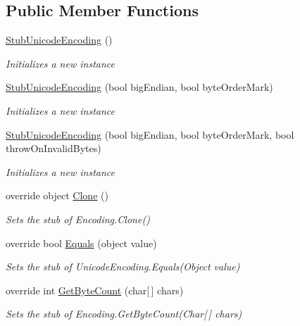 \subsection*{Public Member Functions}
\begin{DoxyCompactItemize}
\item 
\hyperlink{class_system_1_1_text_1_1_fakes_1_1_stub_unicode_encoding_a79ed40791d3b0cd951527b65637039e6}{Stub\-Unicode\-Encoding} ()
\begin{DoxyCompactList}\small\item\em Initializes a new instance\end{DoxyCompactList}\item 
\hyperlink{class_system_1_1_text_1_1_fakes_1_1_stub_unicode_encoding_a7297548b8329e37b5a799c65c074db31}{Stub\-Unicode\-Encoding} (bool big\-Endian, bool byte\-Order\-Mark)
\begin{DoxyCompactList}\small\item\em Initializes a new instance\end{DoxyCompactList}\item 
\hyperlink{class_system_1_1_text_1_1_fakes_1_1_stub_unicode_encoding_a90db09470769143d8acdbf4def6d99cc}{Stub\-Unicode\-Encoding} (bool big\-Endian, bool byte\-Order\-Mark, bool throw\-On\-Invalid\-Bytes)
\begin{DoxyCompactList}\small\item\em Initializes a new instance\end{DoxyCompactList}\item 
override object \hyperlink{class_system_1_1_text_1_1_fakes_1_1_stub_unicode_encoding_a7917244463675a49de7adb5b5403c7b7}{Clone} ()
\begin{DoxyCompactList}\small\item\em Sets the stub of Encoding.\-Clone()\end{DoxyCompactList}\item 
override bool \hyperlink{class_system_1_1_text_1_1_fakes_1_1_stub_unicode_encoding_ae30947f87d26499f38bd56e10ae19d90}{Equals} (object value)
\begin{DoxyCompactList}\small\item\em Sets the stub of Unicode\-Encoding.\-Equals(\-Object value)\end{DoxyCompactList}\item 
override int \hyperlink{class_system_1_1_text_1_1_fakes_1_1_stub_unicode_encoding_a6c75c9653cf07ffd3397220e1793bb80}{Get\-Byte\-Count} (char\mbox{[}$\,$\mbox{]} chars)
\begin{DoxyCompactList}\small\item\em Sets the stub of Encoding.\-Get\-Byte\-Count(\-Char\mbox{[}$\,$\mbox{]} chars)\end{DoxyCompactList}\item 

\end{DoxyCompactItemize}

